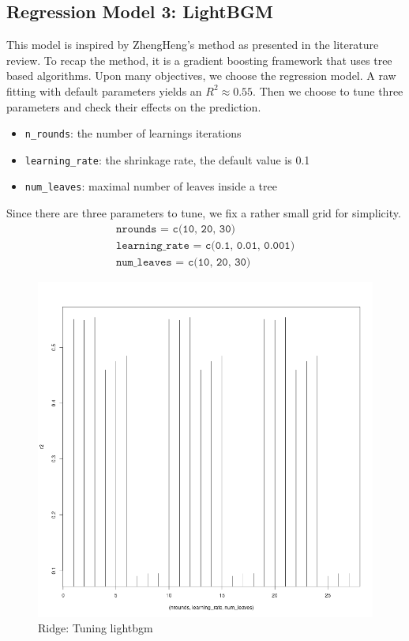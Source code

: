 \documentclass[8pt]{article}
\begin{document}
\subsection{Regression Model 3: LightBGM}
This model is inspired by ZhengHeng's method as presented in the literature review.
To recap the method, it is a gradient boosting framework that uses tree based algorithms. 
Upon many objectives, we choose the regression model. 
A raw fitting with default parameters yields an $R^2 \approx 0.55$. 
Then we choose to tune three parameters and check their effects on the prediction.
\begin{itemize}
    \item \texttt{n\_rounds}: the number of learnings iterations
    \item \texttt{learning\_rate}: the shrinkage rate, the default value is 0.1
    \item \texttt{num\_leaves}: maximal number of leaves inside a tree 
\end{itemize}
Since there are three parameters to tune, we fix a rather small grid for simplicity. 
\begin{align*}
    \texttt{nrounds = c(10, 20, 30)} \\
    \texttt{learning\_rate = c(0.1, 0.01, 0.001)} \\
    \texttt{num\_leaves = c(10, 20, 30)}
\end{align*}
\begin{figure}[H]
    \centering
    \includegraphics*[scale=0.25]{figures/rsquare_lightbgm.png}
    \caption{Ridge: Tuning lightbgm}
\label{fig:lightbgm}
\end{figure}
\end{document}
